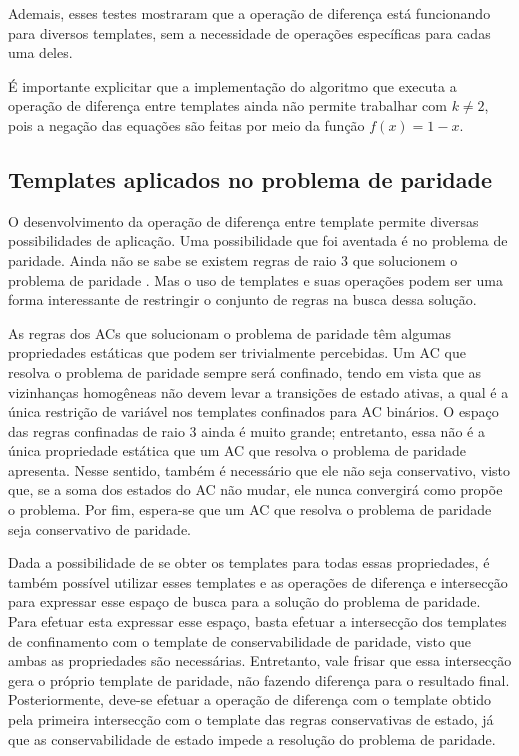 Ademais, esses testes mostraram que a operação de diferença está funcionando para diversos templates, sem a necessidade de operações específicas para cadas uma deles.

É importante explicitar que a implementação do algoritmo que executa a operação de diferença entre templates ainda não permite trabalhar com $k\neq 2$, pois a negação das equações são feitas por meio da função $f(x) = 1 - x$.

\subsection{Templates aplicados no problema de paridade}
O desenvolvimento da operação de diferença entre template permite diversas possibilidades de aplicação.
Uma possibilidade que foi aventada é no problema de paridade. 
Ainda não se sabe se existem regras de raio 3 que solucionem o problema de paridade \cite{Betel2013}. 
Mas o uso de templates e suas operações podem ser uma forma interessante de restringir o conjunto de regras na busca dessa solução.

As regras dos ACs que solucionam o problema de paridade têm algumas propriedades estáticas que podem ser trivialmente percebidas. 
Um AC que resolva o problema de paridade sempre será confinado, tendo em vista que as vizinhanças homogêneas não devem levar a transições de estado ativas, a qual é a única restrição de variável nos templates confinados para AC binários. 
O espaço das regras confinadas de raio 3 ainda é muito grande; entretanto, essa não é a única propriedade estática que um AC que resolva o problema de paridade apresenta.  Nesse sentido, também é necessário que ele não seja conservativo, visto que, se a soma dos estados do AC não mudar, ele nunca convergirá como propõe o problema. 
Por fim, espera-se que um AC que resolva o problema de paridade seja conservativo de paridade.

Dada a possibilidade de se obter os templates para todas essas propriedades, é também possível utilizar esses templates e as operações de diferença e intersecção para expressar esse espaço de busca para a solução do problema de paridade.
Para efetuar esta expressar esse espaço, basta efetuar a intersecção dos templates de confinamento com o template de conservabilidade de paridade, visto que ambas as propriedades são necessárias. Entretanto, vale frisar que essa intersecção gera o próprio template de paridade, não fazendo diferença para o resultado final.
Posteriormente, deve-se efetuar a operação de diferença com o template obtido pela primeira intersecção com o template das regras conservativas de estado, já que as conservabilidade de estado impede a resolução do problema de paridade.

